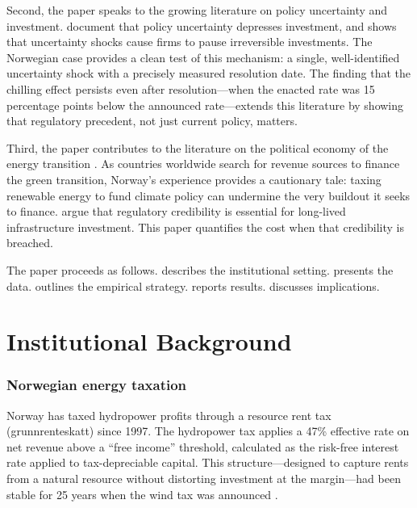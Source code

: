 \documentclass[12pt]{article}
\begin{document}
Second, the paper speaks to the growing literature on policy uncertainty and investment. \citet{baker2016measuring} document that policy uncertainty depresses investment, and \citet{bloom2009impact} shows that uncertainty shocks cause firms to pause irreversible investments. The Norwegian case provides a clean test of this mechanism: a single, well-identified uncertainty shock with a precisely measured resolution date. The finding that the chilling effect persists even after resolution---when the enacted rate was 15 percentage points below the announced rate---extends this literature by showing that regulatory precedent, not just current policy, matters.

Third, the paper contributes to the literature on the political economy of the energy transition \citep{acemoglu2012environment, aghion2016carbon, metcalf2019design}. As countries worldwide search for revenue sources to finance the green transition, Norway's experience provides a cautionary tale: taxing renewable energy to fund climate policy can undermine the very buildout it seeks to finance. \citet{helm2003credible} argue that regulatory credibility is essential for long-lived infrastructure investment. This paper quantifies the cost when that credibility is breached.

The paper proceeds as follows.  describes the institutional setting.  presents the data.  outlines the empirical strategy.  reports results.  discusses implications.


\section{Institutional Background}
\label{sec:background}

\subsubsection*{Norwegian energy taxation} Norway has taxed hydropower profits through a resource rent tax (grunnrenteskatt) since 1997. The hydropower tax applies a 47\% effective rate on net revenue above a ``free income'' threshold, calculated as the risk-free interest rate applied to tax-depreciable capital. This structure---designed to capture rents from a natural resource without distorting investment at the margin---had been stable for 25 years when the wind tax was announced \citep{norfin2023prop78}.
\end{document}
